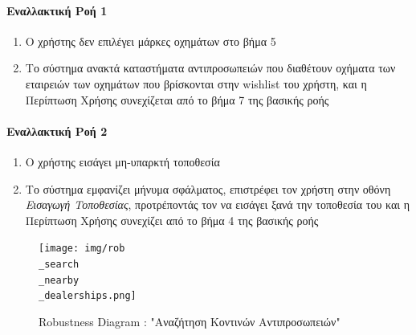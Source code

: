 \documentclass{../ol-softwaremanual}
\begin{document}
	\paragraph{Εναλλακτική Ροή 1}
	\begin{enumerate}
		\item Ο χρήστης δεν επιλέγει μάρκες οχημάτων στο βήμα 5
		\item Το σύστημα ανακτά καταστήματα αντιπροσωπειών που διαθέτουν οχήματα των εταιρειών των οχημάτων που βρίσκονται στην \en wishlist \gr του χρήστη, και η Περίπτωση Χρήσης συνεχίζεται από το βήμα 7 της βασικής ροής
	\end{enumerate}
	
	\paragraph{Εναλλακτική Ροή 2}
	\begin{enumerate}
		\item Ο χρήστης εισάγει μη-υπαρκτή τοποθεσία
		\item Το σύστημα εμφανίζει μήνυμα σφάλματος, επιστρέφει τον χρήστη στην οθόνη \textit{Εισαγωγή Τοποθεσίας}, προτρέποντάς τον να εισάγει ξανά την τοποθεσία του και η Περίπτωση Χρήσης συνεχίζει από το βήμα 4 της βασικής ροής		
	\end{enumerate}
	
	\begin{figure}[htbp!]
		\texttt{[image: img/rob\\\_search\\\_nearby\\\_dealerships.png]}
		\caption{\en Robustness Diagram : "\gr Αναζήτηση Κοντινών Αντιπροσωπειών\en"\gr}
	\end{figure}
	
	\newpage
	
	\centering
	
\end{document}
